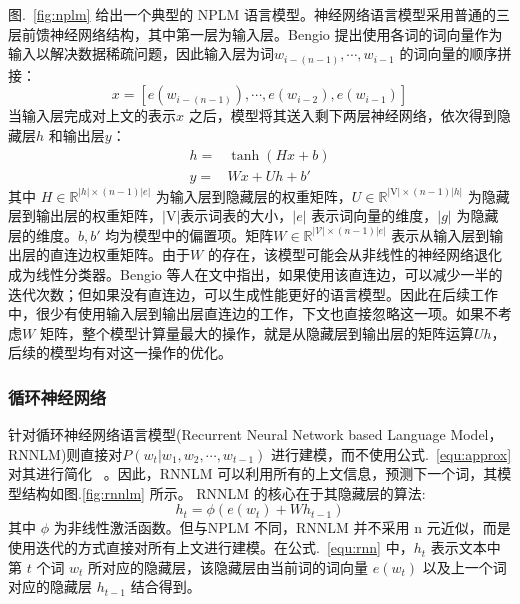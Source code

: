 \documentclass[master,openright,twoside,color]{buaathesis}
\begin{document}
图.~\ref{fig:nplm} 给出一个典型的 NPLM 语言模型。神经网络语言模型采用普通的三层前馈神经网络结构，其中第一层为输入层。Bengio 提出使用各词的词向量作为输入以解决数据稀疏问题，因此输入层为词$w_{i-(n-1)}, \cdots,w_{i-1} $ 的词向量的顺序拼接：
\begin{equation}\label{equ:we}
  x = [e(w_{i-(n-1)}), \cdots , e(w_{i-2}), e{(w_{i-1})}]
\end{equation}
当输入层完成对上文的表示$x$ 之后，模型将其送入剩下两层神经网络，依次得到隐藏层$h$ 和输出层$y$：
\begin{equation}\label{equ:all_nplm}
\begin{split}
h =& \tanh(Hx+b) \\
y =&Wx + Uh +b'
\end{split}
\end{equation}
其中 $H \in \mathbb{R}^{|h| \times (n-1)|e|}$ 为输入层到隐藏层的权重矩阵，$U \in \mathbb{R}^{|\mathrm{V}|\times (n-1)|h|}$ 为隐藏层到输出层的权重矩阵，$ |\mathrm{V}|$表示词表的大小，$|e|$ 表示词向量的维度，$|g|$ 为隐藏层的维度。$b,b'$ 均为模型中的偏置项。矩阵$W \in \mathbb{R}^{|\mathcal{V}|\times (n-1)|e|}$ 表示从输入层到输出层的直连边权重矩阵。由于$W$ 的存在，该模型可能会从非线性的神经网络退化成为线性分类器。Bengio 等人在文中指出，如果使用该直连边，可以减少一半的迭代次数；但如果没有直连边，可以生成性能更好的语言模型。因此在后续工作中，很少有使用输入层到输出层直连边的工作，下文也直接忽略这一项。如果不考虑$W$ 矩阵，整个模型计算量最大的操作，就是从隐藏层到输出层的矩阵运算$Uh$，后续的模型均有对这一操作的优化。


\subsubsection{循环神经网络}
针对循环神经网络语言模型(Recurrent Neural Network based Language Model，RNNLM)则直接对$P(w_t | w_1,w_2,\cdots,w_{t-1}) $ 进行建模，而不使用公式.~\ref{equ:approx} 对其进行简化~\cite{mikolov2012statistical,DBLP:conf/interspeech/MikolovKBCK10} 。因此，RNNLM 可以利用所有的上文信息，预测下一个词，其模型结构如图.\ref{fig:rnnlm} 所示。
RNNLM 的核心在于其隐藏层的算法:
\begin{equation}
\label{equ:rnn}
h_t =\phi(e(w_t) +Wh_{t -1})
\end{equation}
其中 $\phi$ 为非线性激活函数。但与NPLM 不同，RNNLM 并不采用 n 元近似，而是使用迭代的方式直接对所有上文进行建模。在公式.~\ref{equ:rnn} 中，$h_t$ 表示文本中第 $t$ 个词 $w_t$ 所对应的隐藏层，该隐藏层由当前词的词向量 $e(w_t)$ 以及上一个词对应的隐藏层 $h_{t -1}$ 结合得到。
\end{document}

